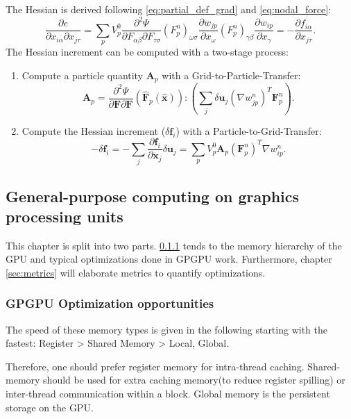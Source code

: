 \documentclass[m,times]{cgMA}
\begin{document}
The Hessian is derived following \ref{eq:partial_def_grad} and \ref{eq:nodal_force}:
\begin{equation}
  \frac{\partial e}{\partial {x}_{i\alpha} \partial x_{j\tau}}
= \sum_p V^0_p\frac { \partial ^ { 2 } \Psi } { \partial  { F}_{\alpha \beta} \partial { F } _{\tau \sigma}}  (F^n_p)_{\omega \sigma}\frac{\partial w_{jp}}{\partial x_\omega} (F^n_p)_{\gamma\beta}\frac{\partial w_{ip}}{\partial x_\gamma} = -\frac{\partial {f}_{i\alpha}}{\partial x_{j\tau}}.
\end{equation}
The Hessian increment can be computed with a two-stage process:
\begin{enumerate}
  \item Compute a particle quantity $\boldsymbol{A}_p$ with a Grid-to-Particle-Transfer:
    \begin{equation}\label{eq:Ap}
    \boldsymbol{A}_p = \frac { \partial ^ { 2 } \Psi } { \partial \boldsymbol { F } \partial \boldsymbol { F } } ( \hat { \boldsymbol { F } } _ { p } ( \hat { \boldsymbol { x } } )) : \left(\sum_j \delta \boldsymbol{u}_j (\nabla w_{jp}^n)^T \boldsymbol{F}^n_p\right).
    \end{equation}
  \item Compute the Hessian increment ($\delta \boldsymbol{f}_i$) with a Particle-to-Grid-Transfer:
    \begin{equation}\label{eq:delta_f}
  - \delta \boldsymbol{f}_i = - \sum_j \frac{\partial \boldsymbol{f}_i}{\partial \boldsymbol{x}_j} \delta \boldsymbol{u}_j = \sum_p V_p^0 \boldsymbol{A}_p(\boldsymbol{F}^n_p)^T \nabla w_{ip}^n.
\end{equation}
\end{enumerate}
\subsection{General-purpose computing on graphics processing units}\label{sec:gpgpu}
This chapter is split into two parts. \ref{sec:optim} tends to the memory hierarchy of the GPU and typical optimizations done in GPGPU work. Furthermore, chapter \ref{sec:metrics} will elaborate metrics to quantify optimizations.
\subsubsection {GPGPU Optimization opportunities}\label{sec:optim}
The speed of these memory types is given in the following starting with the fastest:
Register > Shared Memory > Local, Global.

Therefore, one should prefer register memory for intra-thread caching. Shared-memory should be used for extra caching memory(to reduce register spilling) or inter-thread communication within a block. Global memory is the persistent storage on the GPU.
\end{document}
